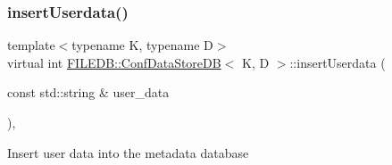 \subsubsection{\texorpdfstring{insertUserdata()}{insertUserdata()}\hspace{0.1cm}{\footnotesize\ttfamily [1/2]}}
{\footnotesize\ttfamily template$<$typename K, typename D$>$ \\
virtual int \mbox{\hyperlink{classFILEDB_1_1ConfDataStoreDB}{F\+I\+L\+E\+D\+B\+::\+Conf\+Data\+Store\+DB}}$<$ K, D $>$\+::insert\+Userdata (\begin{DoxyParamCaption}\item[{const std\+::string \&}]{user\+\_\+data }\end{DoxyParamCaption})\hspace{0.3cm}{\ttfamily [inline]}, {\ttfamily [virtual]}}

Insert user data into the metadata database


